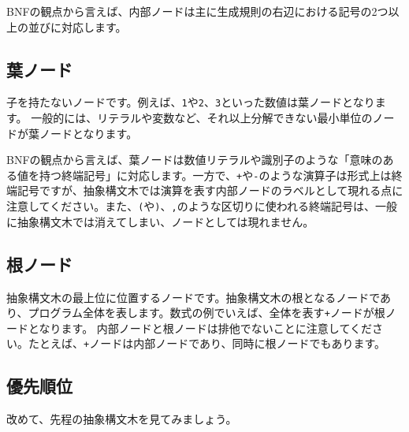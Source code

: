 BNFの観点から言えば、内部ノードは主に生成規則の右辺における記号の2つ以上の並びに対応します。

\hypertarget{chapter2-ux8449ux30ceux30fcux30c9}{%
\subsection{葉ノード}\label{chapter2-ux8449ux30ceux30fcux30c9}}

子を持たないノードです。例えば、\texttt{1}や\texttt{2}、\texttt{3}といった数値は葉ノードとなります。
一般的には、リテラルや変数など、それ以上分解できない最小単位のノードが葉ノードとなります。

BNFの観点から言えば、葉ノードは数値リテラルや識別子のような「意味のある値を持つ終端記号」に対応します。一方で、\texttt{+}や\texttt{-}のような演算子は形式上は終端記号ですが、抽象構文木では演算を表す内部ノードのラベルとして現れる点に注意してください。また、\texttt{(}や\texttt{)}、\texttt{,}のような区切りに使われる終端記号は、一般に抽象構文木では消えてしまい、ノードとしては現れません。

\hypertarget{chapter2-ux6839ux30ceux30fcux30c9}{%
\subsection{根ノード}\label{chapter2-ux6839ux30ceux30fcux30c9}}

抽象構文木の最上位に位置するノードです。抽象構文木の根となるノードであり、プログラム全体を表します。数式の例でいえば、全体を表す\texttt{+}ノードが根ノードとなります。
内部ノードと根ノードは排他でないことに注意してください。たとえば、\texttt{+}ノードは内部ノードであり、同時に根ノードでもあります。

\hypertarget{chapter2-ux512aux5148ux9806ux4f4d}{%
\subsection{優先順位}\label{chapter2-ux512aux5148ux9806ux4f4d}}

改めて、先程の抽象構文木を見てみましょう。

\begin{center}
\end{center}

